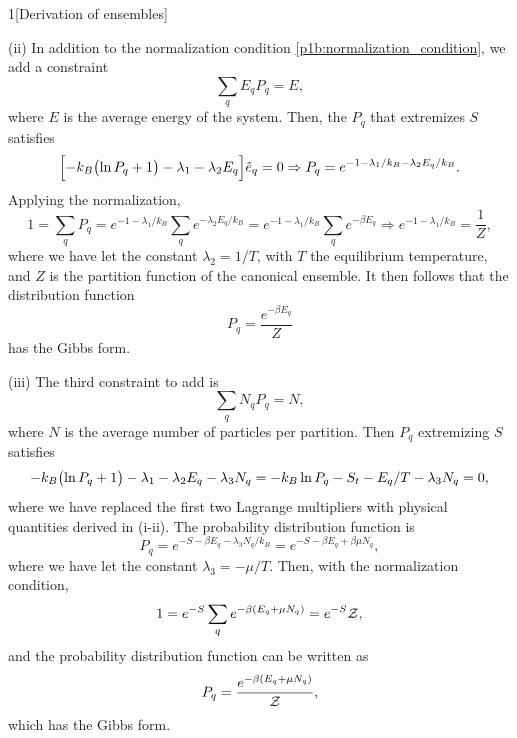 \documentclass[12pt]{article}
\begin{document}
\begin{problem}{1}[Derivation of ensembles]
\begin{solution}
\qquad(ii) In addition to the normalization condition
\eqref{p1b:normalization_condition}, we add a constraint
\begin{equation}
    \sum_qE_qP_q=E, 
\end{equation}
where $E$ is the average energy of the system. Then, the $P_q$ that extremizes
$S$ satisfies
\begin{equation}
    \qty[-k_B\qty(\ln P_q+1)-\lambda_1-\lambda_2E_q]\hat{e}_q=0
    \Rightarrow P_q=e^{-1-\lambda_1/k_B-\lambda_2E_q/k_B}.
\end{equation}
Applying the normalization,
\begin{equation}
    1=\sum_qP_q=e^{-1-\lambda_1/k_B}\sum_qe^{-\lambda_2E_q/k_B}
    = e^{-1-\lambda_1/k_B}\sum_qe^{-\beta E_q}
    \Rightarrow e^{-1-\lambda_1/k_B}=\frac1{Z},
\end{equation}
where we have let the constant $\lambda_2=1/T$, with $T$ the equilibrium
temperature, and $Z$ is the partition function of the canonical ensemble. It
then follows that the distribution function
\begin{equation}
    P_q=\frac{e^{-\beta E_q}}{Z} 
\end{equation}
has the Gibbs form.

(iii) The third constraint to add is
\begin{equation}
    \sum_qN_qP_q=N,
\end{equation}
where $N$ is the average number of particles per partition. Then $P_q$
extremizing $S$ satisfies
\begin{equation}
    -k_B\qty(\ln P_q+1)-\lambda_1-\lambda_2E_q-\lambda_3N_q
    =-k_B\ln P_q-S_t-E_q/T-\lambda_3 N_q=0,
\end{equation}
where we have replaced the first two Lagrange multipliers with physical
quantities derived in (i-ii). The probability distribution function is
\begin{equation}
    P_q=e^{-S-\beta E_q-\lambda_3N_q/k_B}=e^{-S-\beta E_q+\beta\mu N_q},
\end{equation}
where we have let the constant $\lambda_3=-\mu/T$. Then, with the normalization
condition,
\begin{equation}
    1=e^{-S}\sum_qe^{-\beta(E_q+\mu N_q)}=e^{-S}\mathcal{Z}, 
\end{equation}
and the probability distribution function can be written as
\begin{equation}
    P_q=\frac{e^{-\beta(E_q+\mu N_q)}}{\mathcal{Z}}, 
\end{equation}
which has the Gibbs form.
\end{solution}


\end{problem}
\end{document}
